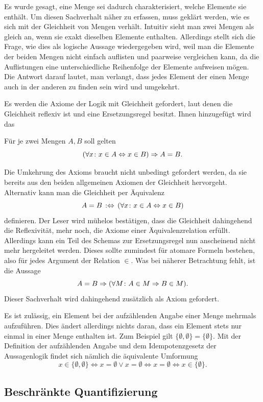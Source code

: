 Es wurde gesagt, eine Menge sei dadurch charakterisiert, welche
Elemente sie enthält. Um diesen Sachverhalt näher zu erfassen, muss
geklärt werden, wie es sich mit der Gleichheit von Mengen verhält.
Intuitiv sieht man zwei Mengen als gleich an, wenn sie exakt dieselben
Elemente enthalten. Allerdings stellt sich die Frage, wie dies als
logische Aussage wiedergegeben wird, weil man die Elemente der beiden
Mengen nicht einfach auflisten und paarweise vergleichen kann, da die
Auflistungen eine unterschiedliche Reihenfolge der Elemente aufweisen
mögen. Die Antwort darauf lautet, man verlangt, dass jedes Element der
einen Menge auch in der anderen zu finden sein wird und umgekehrt.

Es werden die Axiome der Logik mit Gleichheit gefordert, laut denen
die Gleichheit reflexiv ist und eine Ersetzungsregel besitzt. Ihnen
hinzugefügt wird das%
\begin{Axiom}[Extensionalität]\label{Extension}%
\newlinefirst
Für je zwei Mengen $A,B$ soll gelten
\[(\forall x\colon x\in A\Leftrightarrow x\in B)\Rightarrow A=B.\]
\end{Axiom}

\noindent
Die Umkehrung des Axioms braucht nicht unbedingt gefordert werden, da sie
bereits aus den beiden allgemeinen Axiomen der Gleichheit hervorgeht.
Alternativ kann man die Gleichheit per Äquivalenz
\[A = B\,:\Leftrightarrow\, (\forall x\colon x\in A\Leftrightarrow x\in B)\]
definieren. Der Leser wird mühelos bestätigen, dass die Gleichheit dahingehend
die Reflexivität, mehr noch, die Axiome einer Äquivalenzrelation
erfüllt. Allerdings kann ein Teil des Schemas zur Ersetzungsregel nun
anscheinend nicht mehr hergeleitet werden. Dieses sollte
zumindest für atomare Formeln bestehen, also für jedes Argument der
Relation $\in$. Was bei näherer Betrachtung fehlt, ist die Aussage
\[A=B\Rightarrow (\forall M\colon A\in M\Rightarrow B\in M).\]
Dieser Sachverhalt wird dahingehend zusätzlich als Axiom gefordert.

Es ist zulässig, ein Element bei der aufzählenden Angabe einer Menge
mehrmals aufzuführen. Dies ändert allerdings nichts daran, dass ein
Element stets nur einmal in einer Menge enthalten ist. Zum Beispiel
gilt $\{\emptyset,\emptyset\}=\{\emptyset\}$. Mit der Definition der
aufzählenden Angabe und dem Idempotenzgesetz
der Aussagenlogik findet sich nämlich die äquivalente Umformung%
\[x\in\{\emptyset,\emptyset\}\iff x=\emptyset\lor x=\emptyset
\iff x=\emptyset\iff x\in\{\emptyset\}.\]

\subsection{Beschränkte Quantifizierung}

